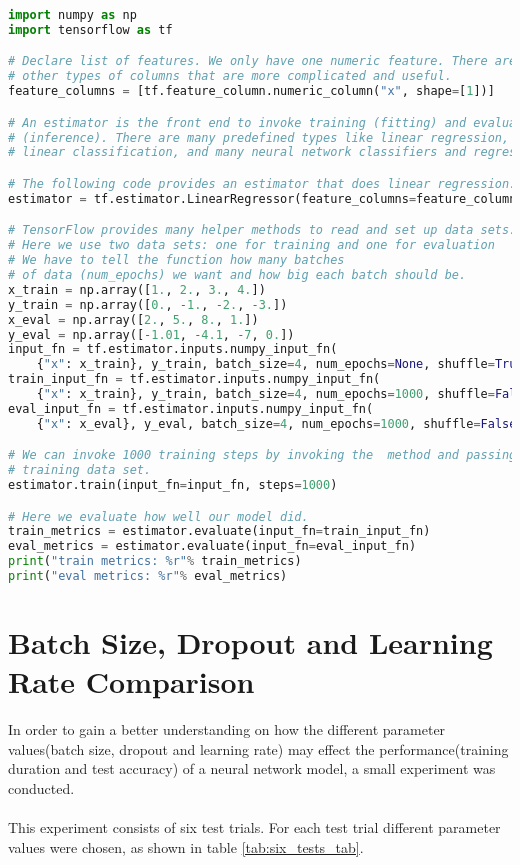 \begin{lstlisting}[language=Python, caption=Linear regression algorithm built with tf.estimator.]
import numpy as np
import tensorflow as tf

# Declare list of features. We only have one numeric feature. There are many
# other types of columns that are more complicated and useful.
feature_columns = [tf.feature_column.numeric_column("x", shape=[1])]

# An estimator is the front end to invoke training (fitting) and evaluation
# (inference). There are many predefined types like linear regression,
# linear classification, and many neural network classifiers and regressors.

# The following code provides an estimator that does linear regression.
estimator = tf.estimator.LinearRegressor(feature_columns=feature_columns)

# TensorFlow provides many helper methods to read and set up data sets.
# Here we use two data sets: one for training and one for evaluation
# We have to tell the function how many batches
# of data (num_epochs) we want and how big each batch should be.
x_train = np.array([1., 2., 3., 4.])
y_train = np.array([0., -1., -2., -3.])
x_eval = np.array([2., 5., 8., 1.])
y_eval = np.array([-1.01, -4.1, -7, 0.])
input_fn = tf.estimator.inputs.numpy_input_fn(
    {"x": x_train}, y_train, batch_size=4, num_epochs=None, shuffle=True)
train_input_fn = tf.estimator.inputs.numpy_input_fn(
    {"x": x_train}, y_train, batch_size=4, num_epochs=1000, shuffle=False)
eval_input_fn = tf.estimator.inputs.numpy_input_fn(
    {"x": x_eval}, y_eval, batch_size=4, num_epochs=1000, shuffle=False)

# We can invoke 1000 training steps by invoking the  method and passing the
# training data set.
estimator.train(input_fn=input_fn, steps=1000)

# Here we evaluate how well our model did.
train_metrics = estimator.evaluate(input_fn=train_input_fn)
eval_metrics = estimator.evaluate(input_fn=eval_input_fn)
print("train metrics: %r"% train_metrics)
print("eval metrics: %r"% eval_metrics)
\end{lstlisting}

\section{Batch Size, Dropout and Learning Rate Comparison}
In order to gain a better understanding on how the different parameter values(batch size, dropout and learning rate) may effect the performance(training duration and test accuracy) of a neural network model, a small experiment was conducted.\\\\
This experiment consists of six test trials. For each test trial different parameter values were chosen, as shown in table \ref{tab:six_tests_tab}.

